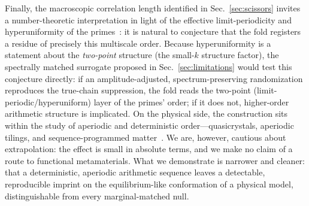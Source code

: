 \documentclass[11pt]{article}
\begin{document}
Finally, the macroscopic correlation length identified in Sec.~\ref{sec:scissors}
invites a number-theoretic interpretation in light of the effective
limit-periodicity and hyperuniformity of the primes~\cite{Torquato2018,Torquato2019}:
it is natural to conjecture that the fold registers a residue of precisely this
multiscale order. Because hyperuniformity is a statement about the \emph{two-point}
structure (the small-$k$ structure factor), the spectrally matched surrogate
proposed in Sec.~\ref{sec:limitations} would test this conjecture directly: if an
amplitude-adjusted, spectrum-preserving randomization reproduces the true-chain
suppression, the fold reads the two-point (limit-periodic/hyperuniform) layer of
the primes' order; if it does not, higher-order arithmetic structure is implicated.
On the physical side, the construction sits within the study of aperiodic and
deterministic order---quasicrystals, aperiodic tilings, and sequence-programmed
matter~\cite{Shechtman,Levine,Macia}. We are, however, cautious about extrapolation:
the effect is small in absolute terms, and we make no claim of a route to functional
metamaterials. What we demonstrate is narrower and cleaner: that a deterministic,
aperiodic arithmetic sequence leaves a detectable, reproducible imprint on the
equilibrium-like conformation of a physical model, distinguishable from every
marginal-matched null.
\end{document}

